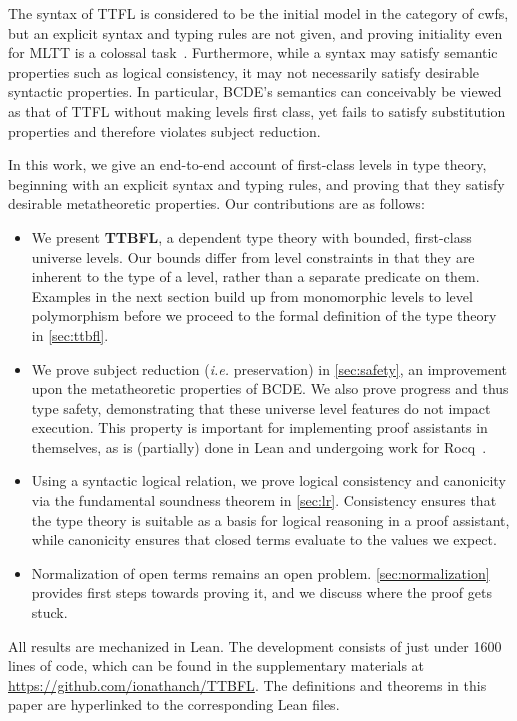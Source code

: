 \documentclass[a4paper,UKenglish,cleveref,autoref,thm-restate]{lipics-v2021}
\makeatletter
\newcommand{\citep}[1]{\cite{#1}}
\newcommand{\repo}{https://github.com/ionathanch/TTBFL}
\newcommand{\lang}{TTBFL\@\xspace}
\newcommand{\ie}{\textit{i.e.}\@\xspace}
\makeatother
\begin{document}
The syntax of TTFL is considered to be the initial model in the category of cwfs,
but an explicit syntax and typing rules are not given,
and proving initiality even for MLTT is a colossal task~\citep{initiality}.
Furthermore, while a syntax may satisfy semantic properties such as logical consistency,
it may not necessarily satisfy desirable syntactic properties.
In particular, BCDE's semantics can conceivably be viewed as
that of TTFL without making levels first class,
yet fails to satisfy substitution properties and therefore violates subject reduction.

In this work, we give an end-to-end account of first-class levels in type theory,
beginning with an explicit syntax and typing rules,
and proving that they satisfy desirable metatheoretic properties.
Our contributions are as follows:

\begin{itemize}[topsep=0pt]
  \item We present \textbf{\lang},
    a dependent type theory with bounded, first-class universe levels.
    Our bounds differ from level constraints in that
    they are inherent to the type of a level,
    rather than a separate predicate on them.
    Examples in the next section build up from monomorphic levels to level polymorphism
    before we proceed to the formal definition of the type theory in \cref{sec:ttbfl}.
  \item We prove subject reduction (\ie preservation) in \cref{sec:safety},
    an improvement upon the metatheoretic properties of BCDE.
    We also prove progress and thus type safety,
    demonstrating that these universe level features do not impact execution.
    This property is important for implementing proof assistants in themselves,
    as is (partially) done in Lean and undergoing work for Rocq~\citep{coq-in-coq}.
  \item Using a syntactic logical relation,
    we prove logical consistency and canonicity
    via the fundamental soundness theorem in \cref{sec:lr}.
    Consistency ensures that the type theory is suitable
    as a basis for logical reasoning in a proof assistant,
    while canonicity ensures that closed terms evaluate to the values we expect.
  \item Normalization of open terms remains an open problem.
    \cref{sec:normalization} provides first steps towards proving it,
    and we discuss where the proof gets stuck.
\end{itemize}
%
All results are mechanized in Lean.
The development consists of just under 1600 lines of code,
which can be found in the supplementary materials at \url{\repo}.
The definitions and theorems in this paper
are hyperlinked to the corresponding Lean files.
\end{document}
